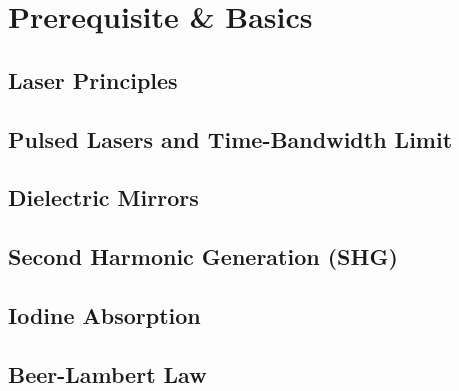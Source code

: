 \section{Prerequisite \& Basics}
\label{sec:voraussetzungen-grundlagen}

\subsection{Laser Principles}

\subsection{Pulsed Lasers and Time-Bandwidth Limit}

\subsection{Dielectric Mirrors}

\subsection{Second Harmonic Generation (SHG)}

\subsection{Iodine Absorption}

\subsection{Beer-Lambert Law}


